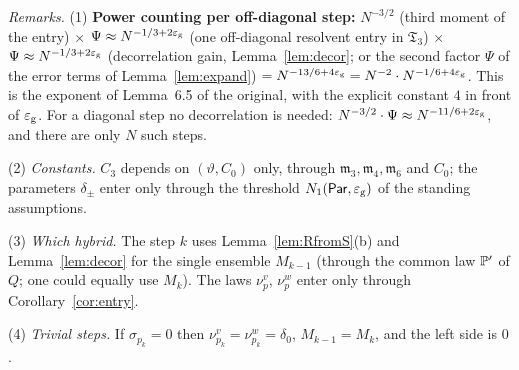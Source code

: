 \noindent\emph{Remarks.} (1) \textbf{Power counting per off-diagonal step:} $N^{-3/2}$ (third moment of the entry) $\times$ $\Psi\approx N^{-1/3+2\eg}$ (one off-diagonal resolvent entry in $\mathfrak T_3$) $\times$
$\Psi\approx N^{-1/3+2\eg}$ (decorrelation gain, Lemma~\ref{lem:decor}; or the second factor $\Psi$ of the error terms of Lemma~\ref{lem:expand}) $=N^{-13/6+4\eg}=N^{-2}\cdot N^{-1/6+4\eg}$. This is the exponent of
Lemma~6.5 of the original, with the explicit constant $4$ in front of $\eg$. For a diagonal step no decorrelation is needed: $N^{-3/2}\cdot\Psi\approx N^{-11/6+2\eg}$, and there are only $N$ such steps.

(2) \emph{Constants.} $C_3$ depends on $(\vartheta,C_0)$ only, through $\mathfrak m_3,\mathfrak m_4,\mathfrak m_6$ and $C_0$; the parameters $\delta_\pm$ enter only through the threshold $N_1(\Par,\eg)$ of the standing assumptions.

(3) \emph{Which hybrid.} The step $k$ uses Lemma~\ref{lem:RfromS}(b) and Lemma~\ref{lem:decor} for the single ensemble $M_{k-1}$ (through the common law $\P'$ of $Q$; one could equally use $M_k$). The laws $\nu^v_{p}$, $\nu^w_{p}$
enter only through Corollary~\ref{cor:entry}.

(4) \emph{Trivial steps.} If $\sigma_{p_k}=0$ then $\nu^v_{p_k}=\nu^w_{p_k}=\delta_0$, $M_{k-1}=M_k$, and the left side is $0$.
